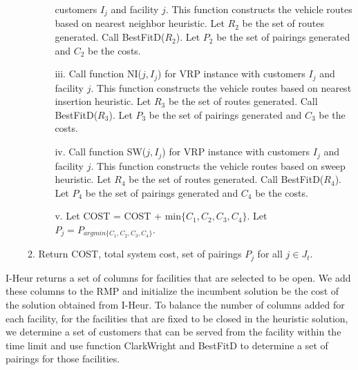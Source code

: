 \begin{itemize}
\begin{enumerate}
\begin{enumerate}
    customers $I_j$  and facility $j$. This function constructs the vehicle routes
    based on nearest neighbor heuristic. Let $R_2$ be the set of routes
    generated. Call BestFitD($R_2$). Let $P_2$ be the set of pairings generated
    and $C_2$ be the costs.
  \item[iii.]Call function NI($j,I_j$) for VRP instance with 
    customers $I_j$  and facility $j$. This function constructs the vehicle routes
    based on nearest insertion heuristic. Let $R_3$ be the set of routes
    generated. Call BestFitD($R_3$). Let $P_3$ be the set of pairings generated
    and $C_3$ be the costs.
  \item [iv.]Call function SW($j,I_j$) for VRP instance with 
    customers $I_j$  and facility $j$. This function constructs the vehicle routes
    based on sweep heuristic. Let $R_4$ be the set of routes
    generated. Call BestFitD($R_4$). Let $P_4$ be the set of pairings generated
    and $C_4$ be the costs.
  \item[v.] Let COST = COST + min$\{C_1, C_2, C_3, C_4\}$. Let
    $P_j = P_{argmin\{C_1, C_2, C_3, C_4\}}$.
  \end{enumerate}
\item Return COST, total system cost, set of pairings $P_j$ for 
  all $j \in J_t$.
\end{enumerate}
\end{itemize}

I-Heur returns a set of columns for facilities that are selected to be open. 
We add these columns to the RMP and initialize the incumbent solution
be the cost of the solution obtained from I-Heur. To balance the number of columns 
added for each facility, for the facilities that are fixed to be closed in the heuristic 
solution, we determine a set of customers that can be served from the facility within 
the time limit and use function ClarkWright and BestFitD to determine a set of
pairings for those facilities. 

